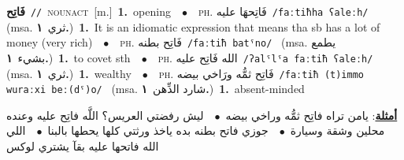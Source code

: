 \documentclass[10pt,a4paper,twoside]{article} %
\begin{document}
\begin{multicols}{2}
{{{\setlength\topsep{0pt}\textbf{\foreignlanguage{arabic}{فَاتِح}}\ {\color{gray}\texttt{//}\color{black}}\ \textsc{noun\textunderscore act}\ [m.]\ \textbf{1.}~opening\ \ $\bullet$\ \ \textsc{ph.} \color{gray} \foreignlanguage{arabic}{فَاتِحهَا عليه}\color{black}\ {\color{gray}\texttt{/{\sffamily faːtiħha ʕaleːh}/}\color{black}}\ \color{gray} (msa. \foreignlanguage{arabic}{ثري}~\foreignlanguage{arabic}{\textbf{١.}})\color{black}\ \textbf{1.}~It is an idiomatic expression that means tha sb has a lot of money (very rich)\ \ $\bullet$\ \ \textsc{ph.} \color{gray} \foreignlanguage{arabic}{فَاتِح بطنه}\color{black}\ {\color{gray}\texttt{/{\sffamily faːtiħ batˤno}/}\color{black}}\ \color{gray} (msa. \foreignlanguage{arabic}{يطمع بشيء}~\foreignlanguage{arabic}{\textbf{١.}})\color{black}\ \textbf{1.}~to covet sth\ \ $\bullet$\ \ \textsc{ph.} \color{gray} \foreignlanguage{arabic}{الله فَاتِح عليه}\color{black}\ {\color{gray}\texttt{/{\sffamily ʔalˤlˤa faːtiħ ʕaleːh}/}\color{black}}\ \color{gray} (msa. \foreignlanguage{arabic}{ثري}~\foreignlanguage{arabic}{\textbf{١.}})\color{black}\ \textbf{1.}~wealthy\ \ $\bullet$\ \ \textsc{ph.} \color{gray} \foreignlanguage{arabic}{فَاتِح ثمُّه ورَاخي بيضه}\color{black}\ {\color{gray}\texttt{/{\sffamily faːtiħ (t)immo wuraːxi beː(dˤ)o}/}\color{black}}\ \color{gray} (msa. \foreignlanguage{arabic}{شارد الذِّهن}~\foreignlanguage{arabic}{\textbf{١.}})\color{black}\ \textbf{1.}~absent-minded\  \begin{flushright}\color{gray}\foreignlanguage{arabic}{\textbf{\underline{\foreignlanguage{arabic}{أمثلة}}}: يامن تراه فاتِح ثمُّه وراخي بيضه\ $\bullet$\ \  ليش رفضتي العريس؟ اللَّه فاتِح عليه وعنده محلين وشقة وسيارة\ $\bullet$\ \  جوزي فاتح بطنه بده ياخذ ورثتي كلها يحطها بالبنا\ $\bullet$\ \  اللي الله فاتحها عليه بقآ يشتري لوكس}\end{flushright}\color{black}} \vspace{2mm}

}}
\end{multicols}
\end{document}
